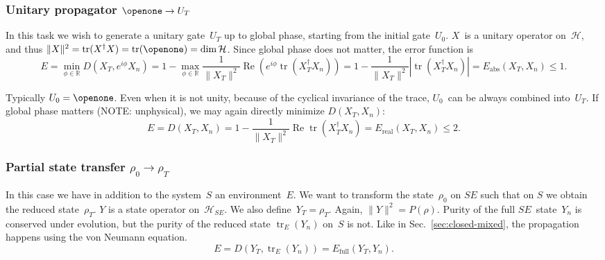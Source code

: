 \documentclass[aps, pra, a4paper, longbibliography, superscriptaddress]{revtex4-1}
\newcommand{\I}{\openone}
\newcommand{\be}{\begin{equation}}
\newcommand{\ee}{\end{equation}}
\newcommand{\R}{{\mathbb R}}  %
\newcommand{\hilb}[1]{\mathcal{#1}}
\DeclareMathOperator{\tr}{tr}
\DeclareMathOperator{\re}{Re}
\newcommand{\vecop}[1]{\widehat{#1}}
\newcommand{\Xt}{X_T}  %
\newcommand{\Xn}{X_n}  %
\begin{document}
\subsubsection{Unitary propagator $\I \to U_T$}
\label{sec:closed-u}
In this task we wish to generate a unitary gate~$U_T$ up to global
phase, starting from the initial gate~$U_0$.
$X$~is a unitary operator on~$\hilb{H}$, and
thus $\|X\|^2 = \tr(X^\dagger X) = \tr(\I) = \dim \hilb{H}$.
Since global phase does not matter, the error function is
\be
E
= \min_{\phi \in \R} D(\Xt, e^{i \phi} \Xn)
= 1 -\max_{\phi \in \R} \frac{1}{\|\Xt\|^2} \re \left( e^{i \phi} \tr(\Xt^\dagger \Xn)\right)
= 1 -\frac{1}{\|\Xt\|^2}|\tr(\Xt^\dagger \Xn)|
= E_\text{abs}(\Xt, \Xn) \le 1.
\ee
\begin{comment}
We can also get rid of phase by explicitly lifting the problem into
Liouville space (see Eq.~\eqref{eq:L-unitary}),
$X = \vecop{V} = V^* \otimes V$,
and then minimize the operator distance~$D(\Xt, \Xn)$.
Using Eq.~\eqref{eq:hat-product}, the norm squared is 
\be
\|X\|^2 = \|\vecop{V}\|^2
= \tr(\vecop{V}^\dagger \vecop{V})
= |\tr(V^\dagger V)|^2
= |\tr(\I)|^2
= (\dim \hilb{H})^2
= \|V\|^4.
\ee
This is constant, so we may maximize the fidelity instead:
\be
f(\Xt, \Xn)
= \frac{1}{\|\Xt\|^2} \re \tr \left(\Xt^\dagger \Xn \right)
= \frac{1}{\|V_T\|^4} \left| \tr \left(V_T^\dagger V_n \right) \right|^2.
\ee
It clearly obeys $0 \le f(\Xt, \Xn) \le 1$.
Much like in
Sec.~\ref{sec:closed-pure},
the problem simplifies back into Hilbert space, and we may equivalently
choose~$X = V$.
\end{comment}

Typically $U_0 = \I$.
Even when it is not unity, because of the cyclical invariance of the trace, $U_0$~can be always combined into~$U_T$.
If global phase matters (NOTE: unphysical), we may again directly minimize
$D(\Xt, \Xn)$:
\be
E
= D(\Xt, \Xn)
= 1 -\frac{1}{\|\Xt\|^2} \re \tr(\Xt^\dagger \Xn)
= E_\text{real}(\Xt, \Xn) \le 2.
\ee




\subsubsection{Partial state transfer $\rho_0 \to \rho_T$}

In this case we have in addition to the system~$S$ an environment~$E$.
We want to transform the state~$\rho_0$ on $SE$ such that
on $S$ we obtain the reduced state~$\rho_T$.
$Y$ is a state operator on~$\hilb{H}_{SE}$.
We also define~$Y_T = \rho_T$.
Again, $\|Y\|^2 = P(\rho)$.
Purity of the full $SE$~state~$Y_n$ is conserved under evolution,
but the purity of the reduced state $\tr_E(Y_n)$ on~$S$ is not.
Like in Sec.~\ref{sec:closed-mixed},
the propagation happens using the von Neumann equation.
\be
E
= D(Y_T, \tr_E(Y_n))
= E_\text{full}(Y_T, Y_n).
\ee
\end{document}
